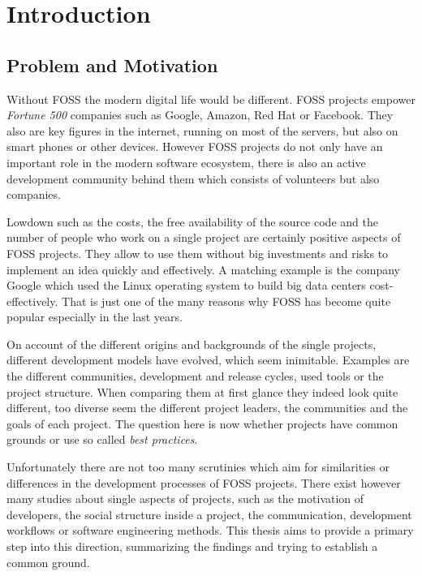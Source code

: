 \chapter{Introduction} %
\label{chap:introduction}

\section{Problem and Motivation} %

Without \ac{FOSS} the modern digital life would be different. \ac{FOSS}
projects empower \emph{Fortune 500} companies such as Google, Amazon, Red Hat
or Facebook. They also are key figures in the internet, running on most of the
servers, but also on smart phones or other devices. However \ac{FOSS} projects
do not only have an important role in the modern software ecosystem, there is
also an active development community behind them which consists of volunteers
but also companies.

Lowdown such as the costs, the free availability of the source code and the
number of people who work on a single project are certainly positive aspects of
\ac{FOSS} projects. They allow to use them without big investments and risks to
implement an idea quickly and effectively. A matching example is the company
Google which used the Linux operating system to build big data centers
cost-effectively. That is just one of the many reasons why \ac{FOSS} has become
quite popular especially in the last years.

On account of the different origins and backgrounds of the single projects,
different development models have evolved, which seem inimitable. Examples are
the different communities, development and release cycles, used tools or the
project structure. When comparing them at first glance they indeed look quite
different, too diverse seem the different project leaders, the communities and
the goals of each project. The question here is now whether projects have
common grounds or use so called \emph{best practices}.

Unfortunately there are not too many scrutinies which aim for similarities or
differences in the development processes of \ac{FOSS} projects. There exist
however many studies about single aspects of projects, such as the motivation
of developers, the social structure inside a project, the communication,
development workflows or software engineering methods. This thesis aims to
provide a primary step into this direction, summarizing the findings and trying
to establish a common ground.


